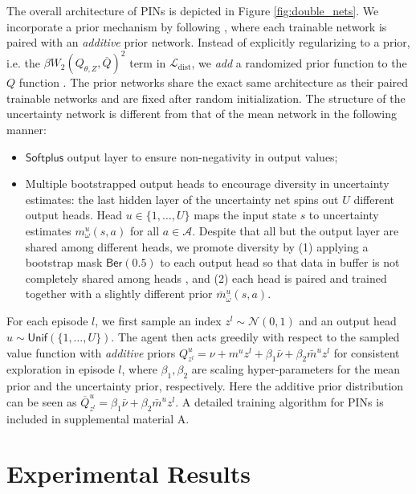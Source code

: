 \documentclass[letterpaper]{article} %
\newcommand{\Sp}[1]{\left(#1\right)}
\theoremstyle{definition}
\begin{document}
The overall architecture of PINs is depicted in Figure \ref{fig:double_nets}. We incorporate a prior mechanism by following \cite{osband2018randomized}, where each trainable network is paired with an \emph{additive} prior network. Instead of explicitly regularizing to a prior, i.e. the $\beta W_2\Sp{Q_{\theta, Z}, \overline{Q}}^2$ term in $\mathcal{L}_{\mathrm{dist}}$, we \emph{add} a randomized prior function to the $Q$ function \cite{osband2018randomized}. The prior networks share the exact same architecture as their paired trainable networks and are fixed after random initialization. The structure of the uncertainty network is different from that of the mean network in the following manner:
\begin{itemize}
    \item $\mathsf{Softplus}$ \cite{glorot2011deep} output layer to ensure non-negativity in output 
    values; 
    \item Multiple bootstrapped output heads to encourage diversity in uncertainty estimates: the last hidden layer of the uncertainty net spins out $U$ different output heads. Head $u \in \{1, \dots, U\}$ maps the input state $s$ to uncertainty estimates $m_\omega^u (s, a)$ for all $a \in \mathcal{A}$. Despite that all but the output layer are shared among different heads, we promote diversity by (1) applying a bootstrap mask $\mathsf{Ber}(0.5)$ to each output head so that data in buffer is not completely shared among heads \cite{osband2016deep}, and (2) each head is paired and trained together with a slightly different prior $\bar{m}_{\bar{\omega}}^u(s,a)$. 
\end{itemize}
For each episode $l$, we first sample an index $z^l \sim \mathcal{N}(0, 1)$ and an output head $u \sim \mathsf{Unif}(\{1, \dots, U\})$. The agent then acts greedily with respect to the sampled value function with \emph{additive} priors $Q^u_{z^l} = \nu + m^u z^l + \beta_1 \bar{\nu} + \beta_2 \bar{m}^u z^l$ for consistent exploration in episode $l$, where $\beta_1, \beta_2$ are scaling hyper-parameters for the mean prior and the uncertainty prior, respectively. Here the additive prior distribution can be seen as $\overline{Q}^u_{z^l} = \beta_1 \bar{\nu} + \beta_2 \bar{m}^u z^l$. A detailed training algorithm for PINs is included in supplemental material A.

\section{Experimental Results}
\end{document}
